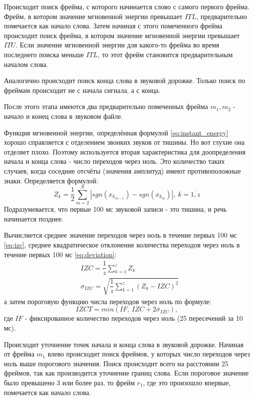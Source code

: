 Происходит поиск фрейма, с которого начинается слово с самого первого фрейма. Фрейм, в котором значение мгновенной энергии превышает $ITL$, предварительно помечается как начало слова. Затем начиная с этого помеченного фрейма происходит поиск фрейма, в котором значение мгновенной энергии превышает $ITU$. Если значение мгновенной энергии для какого-то фрейма во время последнего поиска меньше $ITL$, то этот фрейм становится предварительным началом слова. 

Аналогично происходит поиск конца слова в звуковой дорожке. Только поиск по фреймам происходит не с начала сигнала, а с конца.

После этого этапа имеются два предварительно помеченных фрейма $m_1, m_2$  - начало и конец слова в звуковом файле.

Функция мгновенной энергии, определённая формулой \eqref{eq:instant_energy} хорошо справляется с отделением звонких звуков от тишины. Но вот глухие она отделяет плохо. Поэтому используется вторая характеристика для доопределения начала и конца слова - число переходов через ноль. Это количество таких случаев, когда соседние отсчёты (значения амплитуд) имеют противоположные знаки. Определяется формулой:
\begin{equation}
	Z_k = \dfrac{1}{2} \sum_{m=2}^{N} |sgn(x_{k_{m-1}}) - sgn(x_{k_m})|,~k=\overline{1,z}
\end{equation}
Подразумевается, что первые 100 мс звуковой записи - это тишина, и речь начинается позднее.

Вычисляется среднее значение переходов через ноль в течение первых 100 мс \eqref{eq:izc},  среднее квадратическое отклонение количества переходов через ноль в течение первых 100 мс \eqref{eq:deviation}:
\begin{align}
	\label{eq:izc}
	&IZC = \dfrac{1}{z} \sum_{k=1}^{z} Z_k \\
	\label{eq:deviation}
	&\sigma_{IZC} = \sqrt{\dfrac{1}{z} \sum_{k=1}^{z} (Z_k - IZC)^2}
\end{align}
а затем пороговую функцию числа переходов через ноль по формуле:
\begin{equation}
	IZCT = min(IF,~IZC + 2 \sigma_{IZC}),
\end{equation}
где $IF$ - фиксированное количество переходов через ноль (25 пересечений за 10 мс).

Происходит уточнение точек начала и конца слова в звуковой дорожке. Начиная от фрейма $m_1$ влево происходит поиск фреймов, у которых число переходов через ноль выше порогового значения. Поиск происходит всего на расстоянии 25 фреймов, так как производится уточнение границ слова. Если пороговое значение было превышено 3 или более раз, то фрейм $r_1$, где это произошло впервые, помечается как начало слова.

